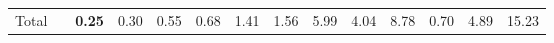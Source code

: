 \begin{tabular}{ll|rrrrrrrrr|rrr}
  \hline
  Total  & &



  


  
  \textbf{0.25} & 0.30 & 0.55 & 0.68 & 1.41 & 1.56 & 5.99 & 4.04 & 8.78 & 0.70 & 4.89 & 15.23 \\


\end{tabular}
